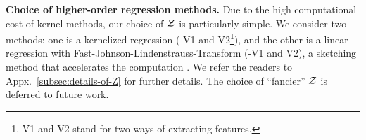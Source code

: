 {\bf Choice of higher-order regression methods.} 
Due to the high computational cost of kernel methods, our choice of ${\mathcal{Z}}$ is particularly simple. We consider two methods: one is a kernelized regression (\lantkKR-V1 and V2\footnote{V1 and V2 stand for two ways of extracting features.}), and the other is a linear regression with Fast-Johnson-Lindenstrauss-Transform (\lantkFJLT-V1 and V2), a sketching method that accelerates the computation \citep{ailon2009fast}. We refer the readers to Appx.~\ref{subsec:details-of-Z} for further details. The choice of ``fancier'' ${\mathcal{Z}}$ is deferred to future work.

